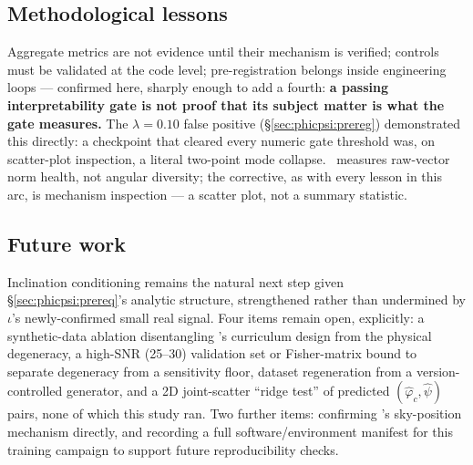 \subsection{Methodological lessons}
\label{subsec:methodological-lessons}

Aggregate metrics are not evidence until their mechanism is verified; controls must be validated at the code level; pre-registration belongs inside engineering loops --- confirmed here, sharply enough to add a fourth: \textbf{a passing interpretability gate is not proof that its subject matter is what the gate measures.}
The $\lambda=0.10$ false positive (\S\ref{sec:phicpsi:prereg}) demonstrated this directly: a checkpoint that cleared every numeric gate threshold was, on scatter-plot inspection, a literal two-point mode collapse.
\stdratio\ measures raw-vector norm health, not angular diversity; the corrective, as with every lesson in this arc, is mechanism inspection --- a scatter plot, not a summary statistic.

\subsection{Future work}
\label{sec:phicpsi:future}

Inclination conditioning remains the natural next step given \S\ref{sec:phicpsi:prereq}'s analytic structure, strengthened rather than undermined by $\iota$'s newly-confirmed small real signal.
Four items remain open, explicitly: a synthetic-data ablation disentangling \pocB's curriculum design from the physical degeneracy, a high-SNR (25--30) validation set or Fisher-matrix bound to separate degeneracy from a sensitivity floor, dataset regeneration from a version-controlled generator, and a 2D joint-scatter ``ridge test'' of predicted $(\hat\varphi_c,\hat\psi)$ pairs, none of which this study ran.
Two further items: confirming \cnnAttn's sky-position mechanism directly, and recording a full software/environment manifest for this training campaign to support future reproducibility checks.
